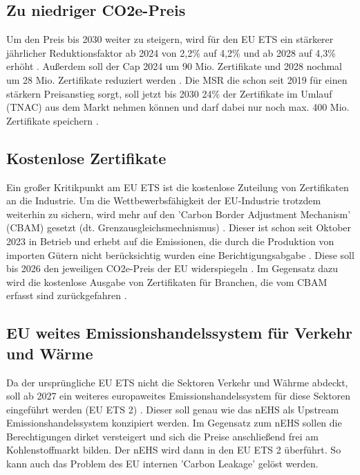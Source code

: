 \subsection{Zu niedriger CO2e-Preis}
Um den Preis bis 2030 weiter zu steigern, wird für den EU ETS ein stärkerer jährlicher Reduktionsfaktor ab 2024 von 2,2\% auf 4,2\% und ab 2028 auf 4,3\% erhöht \cite{ub.2023}. 
Außerdem soll der Cap 2024 um 90 Mio. Zertifikate und 2028 nochmal um 28 Mio. Zertifikate reduziert werden \cite{ub.2023}. 
Die MSR die schon seit 2019 für einen stärkern Preisanstieg sorgt, soll jetzt bis 2030 24\% der Zertifikate im Umlauf (TNAC) aus dem Markt nehmen können und darf dabei nur noch max. 400 Mio. Zertifikate speichern \cite{ub.2023}.

\subsection{Kostenlose Zertifikate}
Ein großer Kritikpunkt am EU ETS ist die kostenlose Zuteilung von Zertifikaten an die Industrie. 
Um die Wettbewerbsfähigkeit der EU-Industrie trotzdem weiterhin zu sichern, wird mehr auf den 'Carbon Border Adjustment Mechanism' (CBAM) gesetzt (dt. Grenzausgleichsmechnismus) \cite{ub.2023}.
Dieser ist schon seit Oktober 2023 in Betrieb und erhebt auf die Emissionen, die durch die Produktion von importen Gütern nicht berücksichtig wurden eine Berichtigungsabgabe \cite{ub2.2023}. 
Diese soll bis 2026 den jeweiligen CO2e-Preis der EU widerspiegeln \cite{ub.2023}.
Im Gegensatz dazu wird die kostenlose Ausgabe von Zertifikaten für Branchen, die vom CBAM erfasst sind zurückgefahren \cite{ub.2023}.

\subsection{EU weites Emissionshandelssystem für Verkehr und Wärme}

Da der ursprüngliche EU ETS nicht die Sektoren Verkehr und Währme abdeckt, soll ab 2027 ein weiteres europaweites Emissionshandelssystem für diese Sektoren eingeführt werden (EU ETS 2) \cite{ub.2023}.
Dieser soll genau wie das nEHS als Upstream Emissionshandelssystem konzipiert werden. Im Gegensatz zum nEHS sollen die Berechtigungen dirket versteigert und sich die Preise anschließend frei am Kohlenstoffmarkt bilden. 
Der nEHS wird dann in den EU ETS 2 überführt. So kann auch das Problem des EU internen 'Carbon Leakage' gelöst werden.

